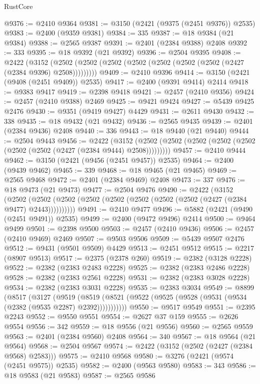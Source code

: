 \begin{lexlean}{RustCore}
\begin{coremodule}
@9376 := @2410 @9364
@9381 := @3150 (@2421 (@9375 (@2451 @9376)) @2535)
@9383 := @2400 (@9359 @9381)
@9384 := 335
@9387 := @18 @9384 (@21 @9384)
@9388 := @2565 @9387
@9391 := @2401 (@2384 @9388) @2408
@9392 := 333
@9395 := @18 @9392 (@21 @9392)
@9396 := @2504 @9395
@9408 := @2422
    (@3152 (@2502 (@2502 (@2502 (@2502 (@2502 (@2502 (@2502 (@2427 (@2384 @9396) @2508)))))))))
@9409 := @2410 @9396
@9414 := @3150 (@2421 (@9408 (@2451 @9409)) @2535)
@9417 := @2400 (@9391 @9414) @2414
@9418 := @9383 @9417
@9419 := @2398 @9418
@9421 := @2457 (@2410 @9356)
@9424 := @2457 (@2410 @9388) @2469
@9425 := @9421 @9424
@9427 := @5439 @9425 @2476
@9430 := @9351 (@9419 @9427) @4429
@9431 := @2611 @9430
@9432 := 338
@9435 := @18 @9432 (@21 @9432)
@9436 := @2565 @9435
@9439 := @2401 (@2384 @9436) @2408
@9440 := 336
@9443 := @18 @9440 (@21 @9440)
@9444 := @2504 @9443
@9456 := @2422
    (@3152 (@2502 (@2502 (@2502 (@2502 (@2502 (@2502 (@2502 (@2427 (@2384 @9444) @2508)))))))))
@9457 := @2410 @9444
@9462 := @3150 (@2421 (@9456 (@2451 @9457)) @2535)
@9464 := @2400 (@9439 @9462)
@9465 := 339
@9468 := @18 @9465 (@21 @9465)
@9469 := @2565 @9468
@9472 := @2401 (@2384 @9469) @2408
@9473 := 337
@9476 := @18 @9473 (@21 @9473)
@9477 := @2504 @9476
@9490 := @2422
    (@3152
      (@2502 (@2502 (@2502 (@2502 (@2502 (@2502 (@2502 (@2502 (@2427 (@2384 @9477) @2443))))))))))
@9491 := @2410 @9477
@9496 := @5882 (@2421 (@9490 (@2451 @9491)) @2535)
@9499 := @2400 (@9472 @9496) @2414
@9500 := @9464 @9499
@9501 := @2398 @9500
@9503 := @2457 (@2410 @9436)
@9506 := @2457 (@2410 @9469) @2469
@9507 := @9503 @9506
@9509 := @5439 @9507 @2476
@9512 := @9431 (@9501 @9509) @4429
@9513 := @2451 @9512
@9515 := @2217 (@8907 @9513)
@9517 := @2375 (@2378 @260)
@9519 := @2382 (@3128 @2228)
@9522 := @2382 (@2383 @2483 @2228)
@9525 := @2382 (@2383 @2486 @2228)
@9528 := @2382 (@2383 @2561 @2228)
@9531 := @2382 (@2383 @3028 @2228)
@9534 := @2382 (@2383 @3031 @2228)
@9535 := @2383 @3034
@9549 := @8899
    (@8517
      (@3127
        (@9519
          (@8519 (@8521 (@9522 (@9525 (@9528 (@9531 (@9534 (@2382 (@9535 @2287) @2392)))))))))))
@9550 := @9517 @9549
@9551 := @2395 @2243
@9552 := @9550 @9551
@9554 := @2627 @37 @159
@9555 := @2626 @9554
@9556 := 342
@9559 := @18 @9556 (@21 @9556)
@9560 := @2565 @9559
@9563 := @2401 (@2384 @9560) @2408
@9564 := 340
@9567 := @18 @9564 (@21 @9564)
@9568 := @2504 @9567
@9574 := @2422 (@3152 (@2502 (@2427 (@2384 @9568) @2583)))
@9575 := @2410 @9568
@9580 := @3276 (@2421 (@9574 (@2451 @9575)) @2535)
@9582 := @2400 (@9563 @9580)
@9583 := 343
@9586 := @18 @9583 (@21 @9583)
@9587 := @2565 @9586

\end{coremodule}
\end{lexlean}
